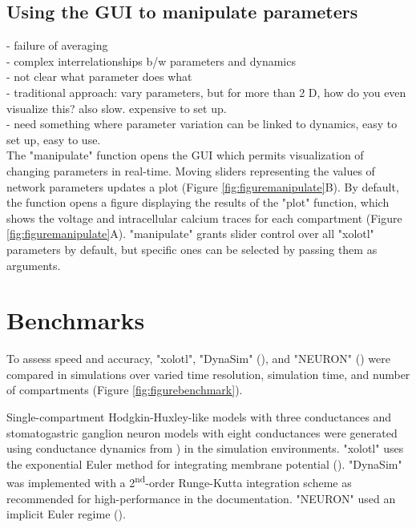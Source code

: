 \documentclass{frontiersSCNS} %
\begin{document}
%
%
%
%
%
%

\subsection{Using the GUI to manipulate parameters}


- failure of averaging \\
- complex interrelationships b/w parameters and dynamics\\
- not clear what parameter does what\\
- traditional approach: vary parameters, but for more than 2 D, how do you even visualize this? also slow. expensive to set up. \\
- need something where parameter variation can be linked to dynamics, easy to set up, easy to use. \\

The "manipulate" function opens the GUI which permits visualization of changing parameters in real-time. Moving sliders representing the values of network parameters updates a plot (Figure \ref{fig:figuremanipulate}B). By default, the function opens a figure displaying the results of the "plot" function, which shows the voltage and intracellular calcium traces for each compartment (Figure \ref{fig:figuremanipulate}A). "manipulate" grants slider control over all "xolotl" parameters by default, but specific ones can be selected by passing them as arguments.




%
%
%
%
%
%

\section{Benchmarks}
\label{benchmarks}

To assess speed and accuracy, "xolotl", "DynaSim" (\cite{sherfeyDynaSimMATLABToolbox2018}), and "NEURON" (\cite{hinesNEURONSimulationEnvironment1997}) were compared in simulations over varied time resolution,  simulation time, and number of compartments (Figure \ref{fig:figurebenchmark}).

Single-compartment Hodgkin-Huxley-like models with three conductances and stomatogastric ganglion neuron models with eight conductances were generated using conductance dynamics from \cite{liuModelNeuronActivityDependent1998}) in the simulation environments. "xolotl" uses the exponential Euler method for integrating membrane potential (\cite{dayanTheoreticalNeuroscience2001}). "DynaSim" was implemented with a 2\textsuperscript{nd}-order Runge-Kutta integration scheme as recommended for high-performance in the documentation. "NEURON" used an implicit Euler regime (\cite{hinesNEURONSimulationEnvironment1997}).
\end{document}
